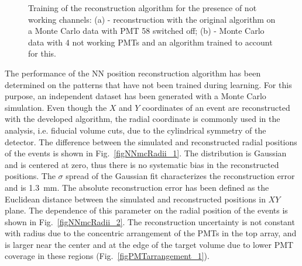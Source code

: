 \begin{figure}[!b]
\centering
{}
\caption[Training of the reconstruction algorithm for the presence of not working channels]{Training of the reconstruction algorithm for the presence of not working channels: (a) - reconstruction with the original algorithm on a Monte Carlo data with PMT 58 switched off; (b) - Monte Carlo data with 4 not working PMTs and an algorithm trained to account for this.}
\label{figDeadChannels}
\end{figure}

The performance of the NN position reconstruction algorithm has been determined on the patterns that have not been trained during learning. For this purpose, an independent dataset has been generated with a Monte Carlo simulation. Even though the $X$ and $Y$ coordinates of an event are reconstructed with the developed algorithm, the radial coordinate is commonly used in the analysis, i.e. fiducial volume cuts, due to the cylindrical symmetry of the detector. The difference between the simulated and reconstructed radial positions of the events is shown in Fig.~\ref{figNNmcRadii_1}. The distribution is Gaussian and is centered at zero, thus there is no systematic bias in the reconstructed positions. The $\sigma$ spread of the Gaussian fit  characterizes the reconstruction error and is 1.3~mm. The absolute reconstruction error has been defined as the Euclidean distance between the simulated and reconstructed positions in $XY$ plane. The dependence of this parameter on the radial position of the events is shown in Fig.~\ref{figNNmcRadii_2}. The reconstruction uncertainty is not constant with radius due to the concentric arrangement of the PMTs in the top array, and is larger near the center and at the edge of the target volume due to lower PMT coverage in these regions (Fig.~\ref{figPMTarrangement_1}). 


